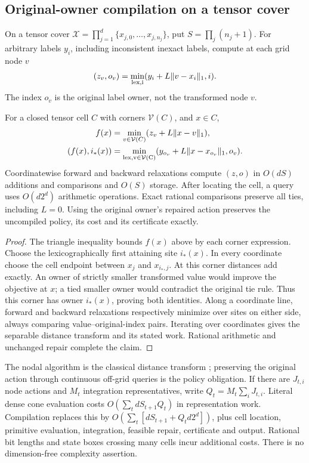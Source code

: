 \subsection{Original-owner compilation on a tensor cover}
On a tensor cover $\mathcal X=\prod_{j=1}^d\{x_{j,0},\ldots,x_{j,n_j}\}$, put $S=\prod_j(n_j+1)$. For arbitrary labels $y_i$, including inconsistent inexact labels, compute at each grid node $v$
\[
 (z_v,o_v)=\min_{\rm lex,i}(y_i+L\|v-x_i\|_1,i).
\]
The index $o_v$ is the original label owner, not the transformed node $v$.

\begin{theorem}\label{thm:compile49}
For a closed tensor cell $C$ with corners $\mathcal V(C)$, and $x\in C$,
\begin{align}\label{eq:compile49}
 f(x)&=\min_{v\in\mathcal V(C)}(z_v+L\|x-v\|_1),\\
 (f(x),i_*(x))&=\min_{\rm lex,v\in\mathcal V(C)}
 (y_{o_v}+L\|x-x_{o_v}\|_1,o_v).\notag
\end{align}
Coordinatewise forward and backward relaxations compute $(z,o)$ in $O(dS)$ additions and comparisons and $O(S)$ storage. After locating the cell, a query uses $O(d2^d)$ arithmetic operations. Exact rational comparisons preserve all ties, including $L=0$. Using the original owner's repaired action preserves the uncompiled policy, its cost and its certificate exactly.
\end{theorem}
\begin{proof}
The triangle inequality bounds $f(x)$ above by each corner expression. Choose the lexicographically first attaining site $i_*(x)$. In every coordinate choose the cell endpoint between $x_j$ and $x_{i_*,j}$. At this corner distances add exactly. An owner of strictly smaller transformed value would improve the objective at $x$; a tied smaller owner would contradict the original tie rule. Thus this corner has owner $i_*(x)$, proving both identities. Along a coordinate line, forward and backward relaxations respectively minimize over sites on either side, always comparing value--original-index pairs. Iterating over coordinates gives the separable distance transform and its stated work. Rational arithmetic and unchanged repair complete the claim.
\end{proof}

The nodal algorithm is the classical distance transform \citep{felzenszwalb2012}; preserving the original action through continuous off-grid queries is the policy obligation. If there are $J_{t,i}$ node actions and $M_t$ integration representatives, write $Q_t=M_t\sum_iJ_{t,i}$. Literal dense cone evaluation costs $O(\sum_t dS_{t+1}Q_t)$ in representation work. Compilation replaces this by $O(\sum_t[dS_{t+1}+Q_td2^d])$, plus cell location, primitive evaluation, integration, feasible repair, certificate and output. Rational bit lengths and state boxes crossing many cells incur additional costs. There is no dimension-free complexity assertion.

